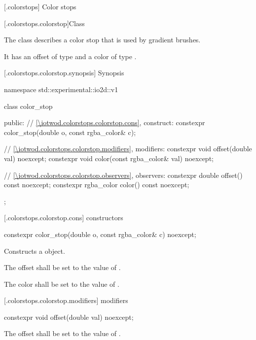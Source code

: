  [\iotwod.colorstops] {Color stops}

 [\iotwod.colorstops.colorstop]{Class }

\pnum
{}%
The class  describes a color stop that is used by gradient brushes.

\pnum
It has an offset of type  and a color of type .

 [\iotwod.colorstops.colorstop.synopsis] { Synopsis}

\begin{codeblock}
namespace std::experimental::io2d::v1 {
  class color_stop {
  public:
  	// \ref{\iotwod.colorstops.colorstop.cons}, construct:
    constexpr color_stop(double o, const rgba_color& c);
    
    // \ref{\iotwod.colorstops.colorstop.modifiers}, modifiers:
    constexpr void offset(double val) noexcept;
	constexpr void color(const rgba_color& val) noexcept;
	
    // \ref{\iotwod.colorstops.colorstop.observers}, observers:
	constexpr double offset() const noexcept;
	constexpr rgba_color color() const noexcept;
  };
}
\end{codeblock}

 [\iotwod.colorstops.colorstop.cons]{ constructors}

%
\begin{itemdecl}
constexpr color_stop(double o, const rgba_color& c) noexcept;
\end{itemdecl}
\begin{itemdescr}
\pnum
\effects
Constructs a  object.

\pnum
The offset shall be set to the value of .

\pnum
The color shall be set to the value of .
\end{itemdescr}

 [\iotwod.colorstops.colorstop.modifiers]{ modifiers}

%
\begin{itemdecl}
constexpr void offset(double val) noexcept;
\end{itemdecl}
\begin{itemdescr}
	\pnum
	\effects
	The offset shall be set to the value of .
\end{itemdescr}

